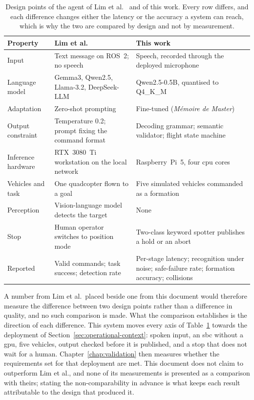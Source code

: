 \begin{table}[htbp]
\centering
\footnotesize
\caption[Design points of Lim et al.\ and of this work]{Design points of the agent of Lim et
al.~\cite{lim2025} and of this work. Every row differs, and each difference changes either the
latency or the accuracy a system can reach, which is why the two are compared by design and not by
measurement.}
\label{tab:lim-positioning}
\begin{tabularx}{\textwidth}{@{}>{\raggedright\arraybackslash}p{2.6cm} >{\raggedright\arraybackslash}X >{\raggedright\arraybackslash}X@{}}
\toprule
Property & Lim et al. & This work \\
\midrule
Input & Text message on ROS~2; no speech & Speech, recorded through the deployed microphone \\
Language model & Gemma3, Qwen2.5, Llama-3.2, DeepSeek-LLM & Qwen2.5-0.5B, quantised to Q4\_K\_M \\
Adaptation & Zero-shot prompting & Fine-tuned (\emph{M\'emoire de Master}) \\
Output constraint & Temperature 0.2; prompt fixing the command format & Decoding grammar; semantic validator; flight state machine \\
Inference hardware & RTX~3080~Ti workstation on the local network & Raspberry~Pi~5, four \gls{cpu} cores \\
Vehicles and task & One quadcopter flown to a goal & Five simulated vehicles commanded as a formation \\
Perception & Vision-language model detects the target & None \\
Stop & Human operator switches to position mode & Two-class keyword spotter publishes a hold or an abort \\
Reported & Valid commands; task success; detection rate & Per-stage latency; recognition under noise; safe-failure rate; formation accuracy; collisions \\
\bottomrule
\end{tabularx}
\end{table}

A number from Lim et al.\ placed beside one from this document would therefore measure the
difference between two design points rather than a difference in quality, and no such comparison is
made. What the comparison establishes is the direction of each difference. This system moves every
axis of Table~\ref{tab:lim-positioning} towards the deployment of
Section~\ref{sec:operational-context}: spoken input, an \gls{sbc} without a \gls{gpu},
five vehicles, output checked before it is published, and a stop that does not wait for a human.
Chapter~\ref{chap:validation} then measures whether the requirements set for that deployment are
met. This document does not claim to outperform Lim et al., and none of its measurements is
presented as a comparison with theirs; stating the non-comparability in advance is what keeps each
result attributable to the design that produced it.

